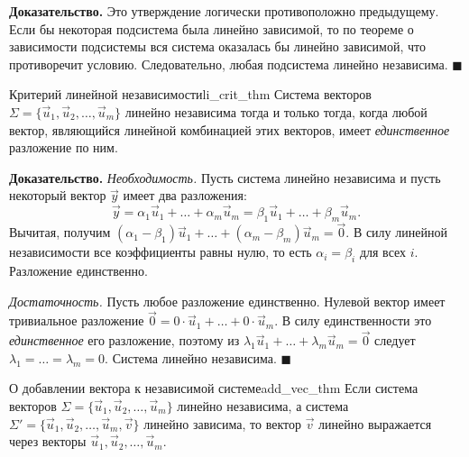\documentclass[12pt,a4paper]{article}
\newenvironment{myproof}{\noindent\textbf{Доказательство.}}{\hfill$\blacksquare$}
\begin{document}
\begin{myproof}
  Это утверждение логически противоположно предыдущему. Если бы некоторая
  подсистема была линейно зависимой, то по теореме о зависимости
  подсистемы вся система оказалась бы линейно зависимой, что противоречит
  условию. Следовательно, любая подсистема линейно независима.
\end{myproof}

\begin{theorem}{Критерий линейной независимости}{li_crit_thm}
  Система векторов $\Sigma = \{\vec{u}_1, \vec{u}_2, \dots, \vec{u}_m\}$
  линейно независима тогда и только тогда, когда любой вектор, являющийся
  линейной комбинацией этих векторов, имеет \emph{единственное} разложение
  по ним.
\end{theorem}

\begin{myproof}
  \textit{Необходимость.} Пусть система линейно независима и пусть
  некоторый вектор $\vec{y}$ имеет два разложения:
  \[
    \vec{y} = \alpha_1 \vec{u}_1 + \dots + \alpha_m \vec{u}_m =
    \beta_1 \vec{u}_1 + \dots + \beta_m \vec{u}_m.
  \]
  Вычитая, получим $(\alpha_1 - \beta_1)\vec{u}_1 + \dots + (\alpha_m -
  \beta_m)\vec{u}_m = \vec{0}$. В силу линейной независимости все
  коэффициенты равны нулю, то есть $\alpha_i = \beta_i$ для всех $i$.
  Разложение единственно.

  \textit{Достаточность.} Пусть любое разложение единственно. Нулевой
  вектор имеет тривиальное разложение $\vec{0} = 0\cdot\vec{u}_1 + \dots +
  0\cdot\vec{u}_m$. В силу единственности это \emph{единственное} его
  разложение, поэтому из $\lambda_1 \vec{u}_1 + \dots + \lambda_m
  \vec{u}_m = \vec{0}$ следует $\lambda_1 = \dots = \lambda_m = 0$. Система
  линейно независима.
\end{myproof}

\begin{theorem}{О добавлении вектора к независимой системе}{add_vec_thm}
  Если система векторов $\Sigma = \{\vec{u}_1, \vec{u}_2, \dots,
  \vec{u}_m\}$ линейно независима, а система $\Sigma' = \{\vec{u}_1,
  \vec{u}_2, \dots, \vec{u}_m, \vec{v}\}$ линейно зависима, то вектор
  $\vec{v}$ линейно выражается через векторы $\vec{u}_1, \vec{u}_2, \dots,
  \vec{u}_m$.
\end{theorem}
\end{document}
